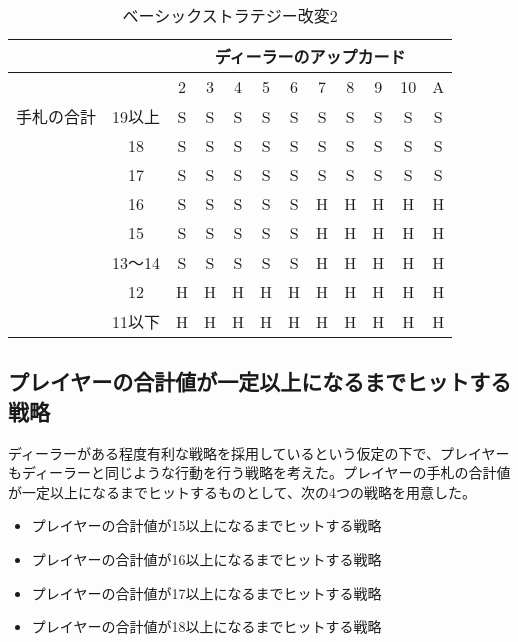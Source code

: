\begin{table}[htbp]
  \centering
  \caption{ベーシックストラテジー改変2\label{bschange2}}
  \begin{tabular}{|c|c|c|c|c|c|c|c|c|c|c|c|}
    \hline
    \multicolumn{2}{|c|}{} & \multicolumn{10}{|c|}{ディーラーのアップカード} \\ \hline
    \multicolumn{2}{|c|}{} & 2 & 3 & 4 & 5 & 6 & 7 & 8 & 9 & 10 & A \\ \hline
    手札の合計 & 19以上 & S & S & S & S & S & S & S & S & S & S \\ \cline{3-12}
              & 18 & S & S & S & S & S & S & S & S & S & S \\ \cline{3-12}
              & 17 & S & S & S & S & S & S & S & S & S & S \\ \cline{3-12}
              & 16 & S & S & S & S & S & H & H & H & H & H \\ \cline{3-12}
              & 15 & S & S & S & S & S & H & H & H & H & H \\ \cline{3-12}
              & 13～14 & S & S & S & S & S & H & H & H & H & H \\ \cline{3-12}
              & 12 & H & H & H & H & H & H & H & H & H & H \\ \cline{3-12}
              & 11以下 & H & H & H & H & H & H & H & H & H & H \\ \hline
  \end{tabular}
\end{table}

\subsection{プレイヤーの合計値が一定以上になるまでヒットする戦略}
ディーラーがある程度有利な戦略を採用しているという仮定の下で、プレイヤーもディーラーと同じような行動を行う戦略を考えた。プレイヤーの手札の合計値が一定以上になるまでヒットするものとして、次の4つの戦略を用意した。
\begin{itemize}
  \item プレイヤーの合計値が15以上になるまでヒットする戦略
  \item プレイヤーの合計値が16以上になるまでヒットする戦略
  \item プレイヤーの合計値が17以上になるまでヒットする戦略
  \item プレイヤーの合計値が18以上になるまでヒットする戦略
\end{itemize}

